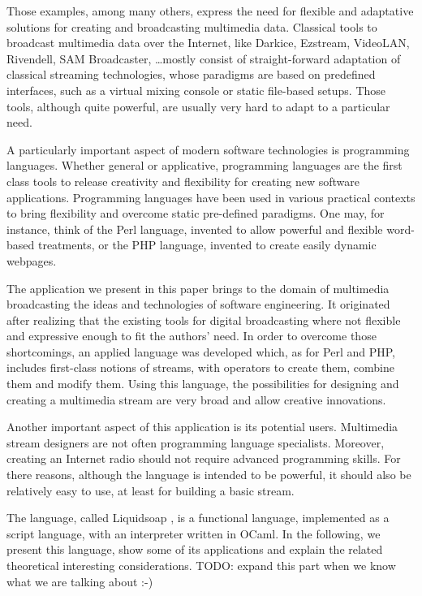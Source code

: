 \documentclass{llncs}
\newcommand{\liquidsoap}{Liquidsoap}
\begin{document}
Those examples, among many others, express the need for flexible
and adaptative solutions for creating and broadcasting multimedia data.
Classical tools to broadcast multimedia data over the Internet, like
Darkice, Ezstream, VideoLAN, Rivendell, SAM Broadcaster, \dots mostly consist 
of straight-forward adaptation of classical streaming technologies, whose 
paradigms are based on predefined interfaces, such as a virtual mixing console
or static file-based setups. Those tools, although quite powerful, are usually very hard 
to adapt to a particular need.

A particularly important aspect of modern software technologies is programming
languages. Whether general or applicative, programming languages are the first 
class tools to release creativity and flexibility for creating new software applications.
Programming languages have been used in various practical contexts to bring flexibility
and overcome static pre-defined paradigms. One may, for instance, think of the Perl 
language, invented to allow powerful and flexible word-based treatments, or the PHP
language, invented to create easily dynamic webpages.

The application we present in this paper brings to the domain of multimedia
broadcasting the ideas and technologies of software engineering. It originated 
after realizing that the existing tools for digital broadcasting where not flexible
and expressive enough to fit the authors' need. In order to overcome those shortcomings,
an applied language was developed which, as for Perl and PHP, includes first-class
notions of streams, with operators to create them, combine them and modify them.
Using this language, the possibilities for designing and creating a multimedia stream
are very broad and allow creative innovations.

Another important aspect of this application is its potential users. Multimedia stream 
designers are not often programming language specialists. Moreover, creating an Internet 
radio should not require advanced programming skills.
For there reasons, although the language is intended to be powerful, it should 
also be relatively easy to use, at least for building a basic stream.

The language, called \liquidsoap{} \cite{liquidsoap}, is a functional language, implemented as 
a script language, with an interpreter written in OCaml. In the following,
we present this language, show some of its applications and explain the 
related theoretical interesting considerations.
TODO: expand this part when we know what we are talking about :-)
\end{document}
